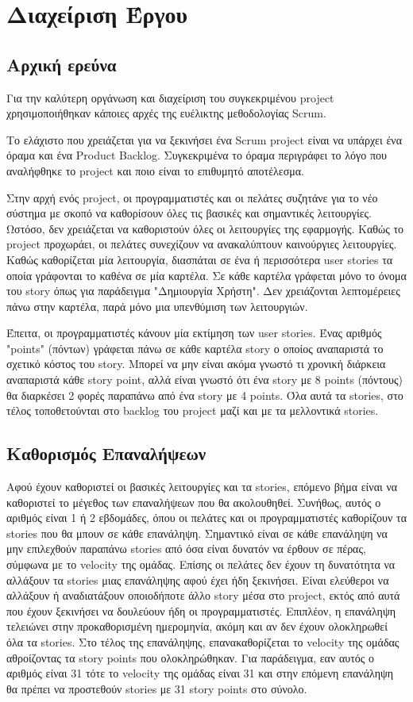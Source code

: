 \documentclass[oneside, 12pt]{book}
\begin{document}
\chapter{Διαχείριση Έργου}
\section{Αρχική ερεύνα}
Για την καλύτερη οργάνωση και διαχείριση του συγκεκριμένου project χρησιμοποιήθηκαν κάποιες αρχές της ευέλικτης μεθοδολογίας Scrum.

Το ελάχιστο που χρειάζεται για να ξεκινήσει ένα Scrum project είναι να 
υπάρχει ένα όραμα και ένα Product Backlog.
Συγκεκριμένα το όραμα περιγράφει το λόγο που αναλήφθηκε το project και ποιο είναι το επιθυμητό αποτέλεσμα.
\cite{schwaber2004agile}

Στην αρχή ενός project, οι προγραμματιστές και οι πελάτες συζητάνε 
για το νέο σύστημα με σκοπό να καθορίσουν όλες τις βασικές και 
σημαντικές λειτουργίες. 
Ωστόσο, δεν χρειάζεται να καθοριστούν όλες οι λειτουργίες της 
εφαρμογής. Καθώς το project προχωράει, οι πελάτες συνεχίζουν να 
ανακαλύπτουν καινούργιες λειτουργίες.
Καθώς καθορίζεται μία λειτουργία, διασπάται σε ένα ή περισσότερα user stories τα οποία γράφονται το καθένα σε μία 
καρτέλα. Σε κάθε καρτέλα γράφεται μόνο το όνομα του story όπως για 
παράδειγμα "Δημιουργία Χρήστη". Δεν χρειάζονται λεπτομέρειες πάνω στην 
καρτέλα, παρά μόνο μια υπενθύμιση των λειτουργιών.

Έπειτα, οι προγραμματιστές κάνουν μία εκτίμηση των user stories. 
Ένας αριθμός "points" (πόντων) γράφεται πάνω σε κάθε καρτέλα story 
ο οποίος αναπαριστά το σχετικό κόστος του story. Μπορεί να μην 
είναι ακόμα γνωστό τι χρονική διάρκεια αναπαριστά κάθε story point, 
αλλά είναι γνωστό ότι ένα story με 8 points (πόντους) θα διαρκέσει 
2 φορές παραπάνω από ένα story με 4 points.
Όλα αυτά τα stories, στο τέλος τοποθετούνται στο backlog του project μαζί και με τα μελλοντικά stories.
\cite[Chapter~3]{AgilePrinciplesC}

\section{Καθορισμός Επαναλήψεων}
Αφού έχουν καθοριστεί οι βασικές λειτουργίες και τα stories, επόμενο βήμα είναι να καθοριστεί το μέγεθος των επαναλήψεων που θα ακολουθηθεί.
Συνήθως, αυτός ο αριθμός είναι 1 ή 2 εβδομάδες, όπου οι πελάτες και οι 
προγραμματιστές καθορίζουν τα stories που θα μπουν σε κάθε επανάληψη.
Σημαντικό είναι σε κάθε επανάληψη να μην επιλεχθούν παραπάνω stories 
από όσα είναι δυνατόν να έρθουν σε πέρας, σύμφωνα με το velocity της 
ομάδας.
Επίσης οι πελάτες δεν έχουν τη δυνατότητα να αλλάξουν τα stories μιας 
επανάληψης αφού έχει ήδη ξεκινήσει.
Είναι ελεύθεροι να αλλάξουν ή αναδιατάξουν οποιοδήποτε άλλο story μέσα 
στο project, εκτός από αυτά που έχουν ξεκινήσει να δουλεύουν ήδη οι 
προγραμματιστές.
Επιπλέον, η επανάληψη τελειώνει στην προκαθορισμένη ημερομηνία, ακόμη 
και αν δεν έχουν ολοκληρωθεί όλα τα stories.
Στο τέλος της επανάληψης, επανακαθορίζεται το velocity της ομάδας 
αθροίζοντας τα story points που ολοκληρώθηκαν. Για παράδειγμα, εαν 
αυτός ο αριθμός είναι 31 τότε το velocity της ομάδας είναι 31 και στην 
επόμενη επανάληψη θα πρέπει να προστεθούν stories με 31 story points 
στο σύνολο.
\cite[Chapter~3]{AgilePrinciplesC}
\end{document}
